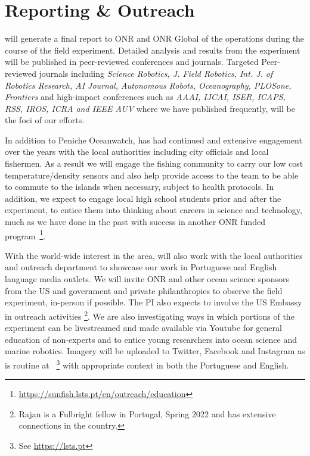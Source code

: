 \section{Reporting \& Outreach}

\proj will generate a final report to ONR and ONR Global of the
operations during the course of the field experiment. Detailed
analysis and results from the experiment will be published in
peer-reviewed conferences and journals. Targeted Peer-reviewed
journals including \emph{Science Robotics, J. Field Robotics,
  Int. J. of Robotics Research, AI Journal, Autonomous Robots,
  Oceanography, PLOSone, Frontiers} and high-impact conferences such
as \emph{AAAI, IJCAI, ISER, ICAPS, RSS, IROS, ICRA and IEEE AUV} where
we have published frequently, will be the foci of our efforts.

In addition to Peniche Oceanwatch, \inst has had continued and
extensive engagement over the years with the local authorities
including \naz city officials and local fishermen.  As a result we
will engage the fishing community to carry our low cost
temperature/density sensors and also help provide access to the team
to be able to commute to the islands when necessary, subject to health
protocols. In addition, we expect to engage local high school students
prior and after the experiment, to entice them into thinking about
careers in science and technology, much as we have done in the past
with success in another ONR funded
program~\footnote{\url{https://sunfish.lsts.pt/en/outreach/education}}. 

With the world-wide interest in the \naz area, \proj will also work
with the local authorities and \univ outreach department to showcase
our work in Portuguese and English language media outlets. We will
invite ONR and other ocean science sponsors from the US and government
and private philanthropies to observe the field experiment, in-person
if possible. The PI also expects to involve the US Embassy in outreach
activities \footnote{Rajan is a Fulbright fellow in
  Portugal, Spring 2022 and has extensive connections in the
  country.}. We are also investigating ways in which portions of the
experiment can be livestreamed and made available via Youtube for
general education of non-experts and to entice young researchers into
ocean science and marine robotics. Imagery will be uploaded to
Twitter, Facebook and Instagram as is routine at \ls ~\footnote{See
  \url{https://lsts.pt}} with appropriate context in both the
Portuguese and English.


